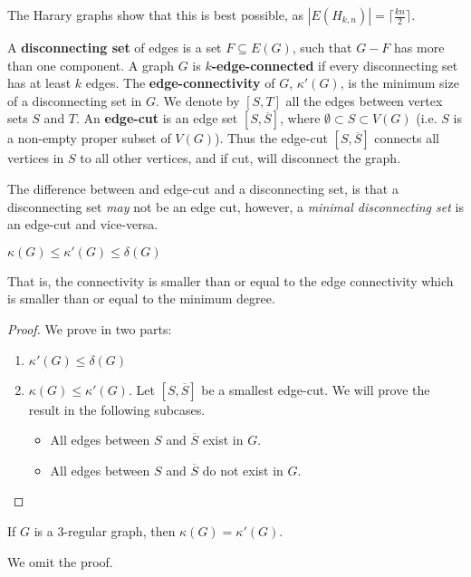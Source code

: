The Harary graphs show that this is best possible, as $|E(H_{k,n})| = \lceil \frac{kn}{2}  \rceil$.

A \textbf{disconnecting set} of edges is a set $F \subseteq E(G)$, such that $G - F$ has more than one component. A graph $G$ is $k$\textbf{-edge-connected} if every disconnecting set has at least $k$ edges. The \textbf{edge-connectivity} of $G$, $\kappa'(G)$, is the minimum size of a disconnecting set in $G$. We denote by $[S, T]$ all the edges between vertex sets $S$ and $T$. An \textbf{edge-cut} is an edge set $[S, \overline{S}]$, where $\emptyset \subset S \subset V(G)$ (i.e. $S$ is a non-empty proper subset of $V(G)$). Thus the edge-cut $[S, \overline{S}]$ connects all vertices in $S$ to all other vertices, and if cut, will disconnect the graph.

The difference between and edge-cut and a disconnecting set, is that a disconnecting set \textit{may} not be an edge cut, however, a \textit{minimal disconnecting set} is an edge-cut and vice-versa.

\begin{theorem}
	\(\kappa(G) \le \kappa'(G) \le \delta(G)\)
\end{theorem}

That is, the connectivity is smaller than or equal to the edge connectivity which is smaller than or equal to the minimum degree.

\begin{proof}
	We prove in two parts:

	\begin{enumerate}
		\item \(\kappa'(G) \le \delta(G)\)
		\item \(\kappa(G) \le \kappa'(G)\). Let $[S, \overline{S}]$ be a smallest edge-cut. We will prove the result in the following subcases.
		      \begin{itemize}
			      \item All edges between $S$ and $\overline{S}$ exist in $G$.
			      \item All edges between $S$ and $\overline{S}$ do not exist in $G$.
		      \end{itemize}
	\end{enumerate}
\end{proof}


\begin{theorem}
	If $G$ is a 3-regular graph, then \(\kappa(G) = \kappa'(G)\).
\end{theorem}

We omit the proof.

